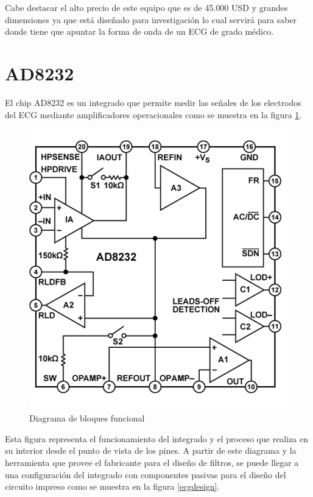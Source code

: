 Cabe destacar el alto precio de este equipo que es de 45.000 USD y grandes dimensiones ya que está diseñado para investigación lo cual servirá para saber donde tiene que apuntar la forma de onda de un ECG de grado médico.\\

\newpage
\section{AD8232}
El chip AD8232 es un integrado que permite medir las señales de los electrodos del ECG mediante amplificadores operacionales como se muestra en la figura \ref{ad8232}.

\begin{figure}[H]
\centering
\includegraphics[scale=0.4]{figuras/ecg/ad8232.png}
\caption{Diagrama de bloques funcional}
\label{ad8232}
\end{figure}

Esta figura representa el funcionamiento del integrado y el proceso que realiza en su interior desde el punto de vista de los pines. 
A partir de este diagrama y la herramienta que provee el fabricante para el diseño de filtros, se puede llegar a una configuración del integrado con componentes pasivas para el diseño del circuito impreso como se muestra en la figura \ref{ecgdesign}.\\

